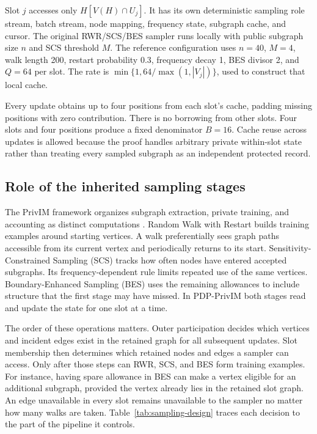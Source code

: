 Slot $j$ accesses only $H[V(H)\cap U_j]$. It has its own deterministic sampling role stream, batch stream, node mapping, frequency state, subgraph cache, and cursor. The original RWR/SCS/BES sampler runs locally with public subgraph size $n$ and SCS threshold $M$. The reference configuration uses $n=40$, $M=4$, walk length 200, restart probability 0.3, frequency decay 1, BES divisor 2, and $Q=64$ per slot. The rate is $\min\{1,64/\max(1,|V_j|)\}$, used to construct that local cache.

Every update obtains up to four positions from each slot's cache, padding missing positions with zero contribution. There is no borrowing from other slots. Four slots and four positions produce a fixed denominator $B=16$. Cache reuse across updates is allowed because the proof handles arbitrary private within-slot state rather than treating every sampled subgraph as an independent protected record.

\subsection{Role of the inherited sampling stages}
The PrivIM framework organizes subgraph extraction, private training, and accounting as distinct computations \cite{hou2025}. Random Walk with Restart builds training examples around starting vertices. A walk preferentially sees graph paths accessible from its current vertex and periodically returns to its start. Sensitivity-Constrained Sampling (SCS) tracks how often nodes have entered accepted subgraphs. Its frequency-dependent rule limits repeated use of the same vertices. Boundary-Enhanced Sampling (BES) uses the remaining allowances to include structure that the first stage may have missed. In PDP-PrivIM both stages read and update the state for one slot at a time.

The order of these operations matters. Outer participation decides which vertices and incident edges exist in the retained graph for all subsequent updates. Slot membership then determines which retained nodes and edges a sampler can access. Only after those steps can RWR, SCS, and BES form training examples. For instance, having spare allowance in BES can make a vertex eligible for an additional subgraph, provided the vertex already lies in the retained slot graph. An edge unavailable in every slot remains unavailable to the sampler no matter how many walks are taken. Table~\ref{tab:sampling-design} traces each decision to the part of the pipeline it controls.

